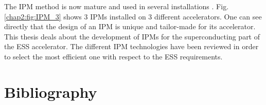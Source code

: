 \begin{refsection}
  The IPM method is now mature and used in several installations \cite{Krider1989,Wittenburg1992,Satou2006,Giacomini2011,Morris2011,egberts2012}.
  Fig. \ref{chap2:fig:IPM_3} shows 3 IPMs installed on 3 different accelerators. One can see directly that the design of an IPM is unique and tailor-made for its accelerator. This thesis deals about the development of IPMs for the superconducting part of the ESS accelerator. The different IPM technologies have been reviewed in order to select the most efficient one with respect to the ESS requirements.

  

  \cleardoublepage
  \section*{Bibliography}
  \label{ch2:bib}
  \printbibliography[heading=subbibliography]

\end{refsection}
